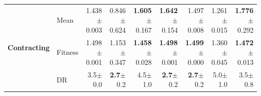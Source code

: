 \begin{table}[htbp]
{\begin{tabular}{ll||r|rrrrrr}
\midrule
\multirow{3}{*}{\textbf{Contracting}} & Mean & \cellcolor[HTML]{F6DB9E} 1.438{\scriptsize\color{black!60}$\pm$0.003} & \textcolor{black!60}{0.846}{\scriptsize\color{black!60}$\pm$0.624} & \textbf{1.605}{\scriptsize\color{black!60}$\pm$0.167} & \textbf{1.642}{\scriptsize\color{black!60}$\pm$0.154} & 1.497{\scriptsize\color{black!60}$\pm$0.008} & \textcolor{black!60}{1.261}{\scriptsize\color{black!60}$\pm$0.015} & \textbf{1.776}{\scriptsize\color{black!60}$\pm$0.292} \\
 & Fitness & \cellcolor[HTML]{F2CF80} 1.498{\scriptsize\color{black!60}$\pm$0.001} & \textcolor{black!60}{1.153}{\scriptsize\color{black!60}$\pm$0.347} & \textbf{1.458}{\scriptsize\color{black!60}$\pm$0.028} & \textbf{1.498}{\scriptsize\color{black!60}$\pm$0.001} & \textbf{1.499}{\scriptsize\color{black!60}$\pm$0.000} & \textcolor{black!60}{1.360}{\scriptsize\color{black!60}$\pm$0.045} & \textbf{1.472}{\scriptsize\color{black!60}$\pm$0.013} \\
 & DR & 3.5{\scriptsize\color{black!60}$\pm$0.0} & \textbf{2.7}{\scriptsize\color{black!60}$\pm$0.2} & \textcolor{black!60}{4.5}{\scriptsize\color{black!60}$\pm$1.0} & \textbf{2.7}{\scriptsize\color{black!60}$\pm$0.2} & \textbf{2.7}{\scriptsize\color{black!60}$\pm$0.2} & \textcolor{black!60}{5.0}{\scriptsize\color{black!60}$\pm$1.0} & 3.5{\scriptsize\color{black!60}$\pm$0.8} \\
\bottomrule
\end{tabular}
}
\end{table}

